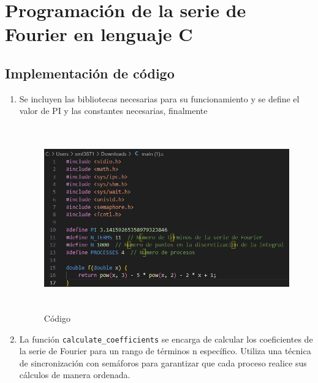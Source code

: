 \section{Programación de la serie de Fourier en lenguaje C}

\subsection{Implementación de código}

\begin{enumerate} 
	\def\labelenumi{\arabic{enumi}.} 
	\item Se incluyen las bibliotecas necesarias para su funcionamiento y se define el valor de PI y las constantes necesarias, finalmente
	
	\begin{figure}[H]
		\centering
		\includegraphics[width=5.55729in,height=3.12944in]{media/image18.png}
		\caption{Código}
	\end{figure}
	
	\item La función \texttt{calculate\_coefficients} se encarga de calcular los coeficientes de la serie de Fourier para un rango de términos n específico. Utiliza una técnica de sincronización con semáforos para garantizar que cada proceso realice sus cálculos de manera ordenada.
	

\end{enumerate}
